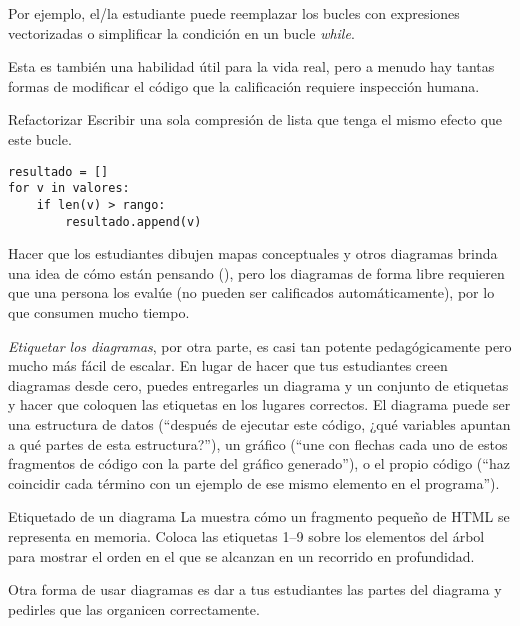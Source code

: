 Por ejemplo, 
el/la estudiante puede reemplazar los bucles con expresiones vectorizadas
 o simplificar la condición en un bucle \emph{while}.

Esta es también una habilidad útil para la vida real, 
pero a menudo hay tantas formas de modificar el código
que la calificación requiere inspección humana.

\begin{aside}{Refactorizar}
  Escribir una sola compresión de lista que tenga el mismo efecto que este bucle.

\begin{verbatim}
resultado = []
for v in valores:
    if len(v) > rango:
        resultado.append(v)
\end{verbatim}
\end{aside}



Hacer que los estudiantes dibujen mapas conceptuales y otros diagramas brinda una idea de cómo están pensando (),
pero los diagramas de forma libre requieren que una persona los evalúe (no pueden ser calificados automáticamente), por lo que consumen mucho tiempo.

\emph{Etiquetar los diagramas},
por otra parte, 
es casi tan potente pedagógicamente  
pero mucho más fácil de escalar.
En lugar de hacer que tus estudiantes creen diagramas desde cero, puedes entregarles un diagrama y un conjunto de etiquetas y hacer que coloquen las etiquetas en los lugares correctos.
El diagrama puede ser una estructura de datos (``después de ejecutar este código, ¿qué variables apuntan a qué partes de esta estructura?''), un gráfico (``une con flechas cada uno de estos fragmentos de código con la parte del gráfico generado''), o el propio código (``haz coincidir cada término con un ejemplo de ese mismo elemento en el programa'').

\begin{aside}{Etiquetado de un diagrama}
  La  muestra
cómo un fragmento pequeño de HTML se representa en memoria.
  Coloca las etiquetas 1--9 sobre los elementos del árbol 
  para mostrar el orden en el que se alcanzan en un recorrido en profundidad.
\end{aside}




Otra forma de usar diagramas es dar a tus estudiantes las partes del diagrama y pedirles que las organicen correctamente.

